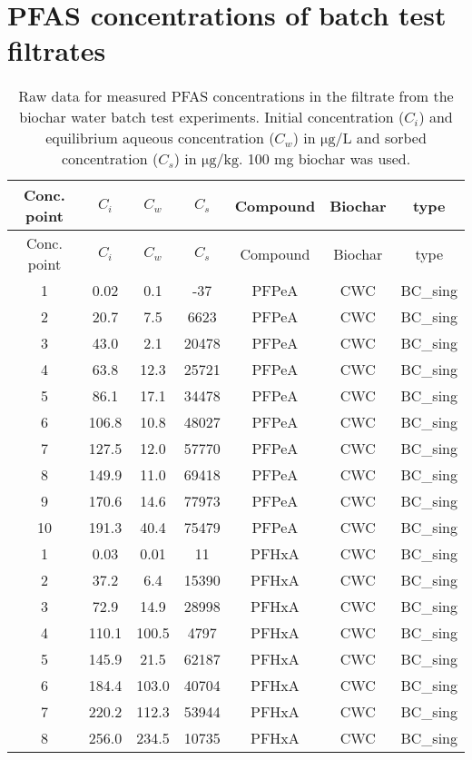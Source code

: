 \chapter{PFAS concentrations of batch test filtrates}\label{appSec:rawdata} 

\begin{longtable}[c]{ccccccc}
\caption{Raw data for measured PFAS concentrations in the filtrate from the biochar water batch test experiments. Initial concentration ($C_i$) and equilibrium aqueous concentration ($C_w$) in $\mathrm{\mu g/L}$ and sorbed concentration ($C_s$) in $\mathrm{\mu g/kg}$. 100 mg biochar was used. \label{apptab:BC_batchtest}} \\
\toprule
Conc. point & $C_i$ & $C_w$ & $C_s$ & Compound & Biochar & type \\ \midrule \endfirsthead \toprule
Conc. point & $C_i$ & $C_w$ & $C_s$ & Compound & Biochar & type \\ \midrule \endhead
1 & 0.02 & 0.1 & -37 & PFPeA & CWC & BC\_sing \\
2 & 20.7 & 7.5 & 6623 & PFPeA & CWC & BC\_sing \\
3 & 43.0 & 2.1 & 20478 & PFPeA & CWC & BC\_sing \\
4 & 63.8 & 12.3 & 25721 & PFPeA & CWC & BC\_sing \\
5 & 86.1 & 17.1 & 34478 & PFPeA & CWC & BC\_sing \\
6 & 106.8 & 10.8 & 48027 & PFPeA & CWC & BC\_sing \\
7 & 127.5 & 12.0 & 57770 & PFPeA & CWC & BC\_sing \\
8 & 149.9 & 11.0 & 69418 & PFPeA & CWC & BC\_sing \\
9 & 170.6 & 14.6 & 77973 & PFPeA & CWC & BC\_sing \\
10 & 191.3 & 40.4 & 75479 & PFPeA & CWC & BC\_sing \\
1 & 0.03 & 0.01 & 11 & PFHxA & CWC & BC\_sing \\
2 & 37.2 & 6.4 & 15390 & PFHxA & CWC & BC\_sing \\
3 & 72.9 & 14.9 & 28998 & PFHxA & CWC & BC\_sing \\
4 & 110.1 & 100.5 & 4797 & PFHxA & CWC & BC\_sing \\
5 & 145.9 & 21.5 & 62187 & PFHxA & CWC & BC\_sing \\
6 & 184.4 & 103.0 & 40704 & PFHxA & CWC & BC\_sing \\
7 & 220.2 & 112.3 & 53944 & PFHxA & CWC & BC\_sing \\
8 & 256.0 & 234.5 & 10735 & PFHxA & CWC & BC\_sing \\

\end{longtable}
